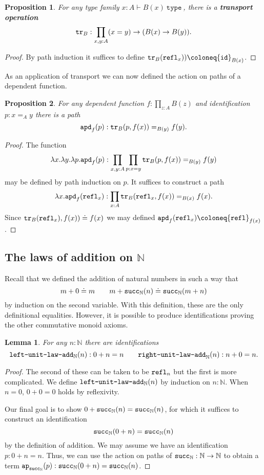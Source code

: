\documentclass{amsart}
\theoremstyle{theorem}
\newtheorem*{lem}{Lemma}
\newtheorem*{prop}{Proposition}
\theoremstyle{definition}
\theoremstyle{remark}
\newcommand{\0}{\mathbbe{0}}
\newcommand{\1}{\mathbbe{1}}
\newcommand{\2}{\mathbbe{2}}
\newcommand{\3}{\mathbbe{3}}
\newcommand{\4}{\mathbbe{4}}
\newcommand{\univ}{{~\texttt{type}~}}
\newcommand{\term}[1]{{\textup{\texttt{#1}}}}
\newcommand{\id}{\term{id}}
\newcommand{\bN}{{\mathbb{N}}}
\newcommand{\suc}{\term{succ}_{\bN}}
\newcommand{\refl}{\term{refl}}
\newcommand{\ap}{\term{ap}}
\newcommand{\tr}{\term{tr}}
\newcommand{\apd}{\term{apd}}
\begin{document}
\begin{prop} For any type family $x : A \vdash B(x) \univ$, there is a \textbf{transport operation}
\[ \tr_B : \prod_{x,y :A} (x=y) \to (B(x) \to B(y)).\]
\end{prop}
\begin{proof}
By path induction it suffices to define $\tr_B(\refl_x)) \coloneq \id_{B(x)}$.
\end{proof}

As an application of transport we can now defined the action on paths of a dependent function.

\begin{prop} For any dependent function $f : \prod_{z: A} B(z)$ and identification $p : x=_A y$ there is a path
\[ \apd_f(p) : \tr_B(p, f(x)) =_{B(y)} f(y).\]
\end{prop}
\begin{proof}
The function
 \[ \lambda x . \lambda y. \lambda p. \apd_f(p) : \prod_{x,y:A} \prod_{p : x=y} \tr_B(p, f(x)) =_{B(y)} f(y)\]
 may be defined by path induction on $p$. It suffices to construct a path
 \[ \lambda x . \apd_f(\refl_x) : \prod_{x :A} \tr_B(\refl_x,f(x)) =_{B(x)} f(x).\]
Since  $\tr_B(\refl_x),f(x)) \doteq f(x)$ we may defined $\apd_f(\refl_x) \coloneq \refl_{f(x)}$.
\end{proof}

\subsection*{The laws of addition on $\bN$}

Recall that we defined the addition of natural numbers in such a way that
\[ m+ 0 \doteq m \qquad m+ \suc(n) \doteq \suc(m+n)\]
by induction on the second variable. With this definition, these are the only definitional equalities. However, it is possible to produce identifications proving the other commutative monoid axioms.

\begin{lem} For any $n : \bN$ there are identifications
\[\term{left-unit-law-add}_\bN(n) : 0 + n = n \qquad \term{right-unit-law-add}_\bN(n) : n+0=n.\]
\end{lem}
\begin{proof}
The second of these can be taken to be $\refl_n$ but the first is more complicated. We define $\term{left-unit-law-add}_\bN(n)$ by induction on $n : \bN$. When $n = 0$, $0+0=0$ holds by reflexivity. 

Our final goal is to show $0+\suc(n) = \suc(n)$, for which it suffices to construct an identification \[ \suc(0+n) = \suc(n)\]
by the definition of addition. We may assume we have an identification $p : 0 + n = n$. Thus, we can use the action on paths of $\suc : \bN \to \bN$  to obtain a term $\ap_{\suc}(p) : \suc(0+n) = \suc(n)$.
\end{proof}
\end{document}
